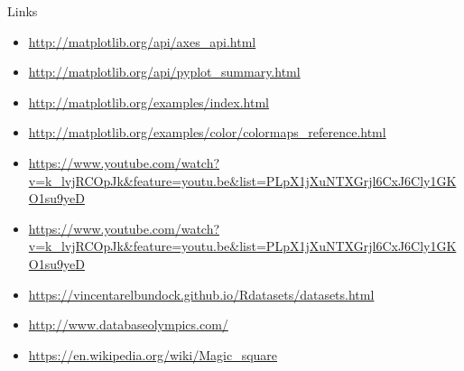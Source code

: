 \documentclass{beamer}
\begin{document}
\begin{frame}
\begin{center}
\huge{Links}
\end{center}
\scriptsize{
\begin{itemize}
\item \url{http://matplotlib.org/api/axes_api.html}
\item \url{http://matplotlib.org/api/pyplot_summary.html}
\item \url{http://matplotlib.org/examples/index.html}
\item \url{http://matplotlib.org/examples/color/colormaps_reference.html}
\item \url{https://www.youtube.com/watch?v=k_lvjRCOpJk&feature=youtu.be&list=PLpX1jXuNTXGrjl6CxJ6Cly1GKO1su9yeD}
\item \url{https://www.youtube.com/watch?v=k_lvjRCOpJk&feature=youtu.be&list=PLpX1jXuNTXGrjl6CxJ6Cly1GKO1su9yeD}
\item \url{https://vincentarelbundock.github.io/Rdatasets/datasets.html}
\item \url{http://www.databaseolympics.com/}
\item \url{https://en.wikipedia.org/wiki/Magic_square}
\end{itemize}
}
\end{frame}



\end{document}
